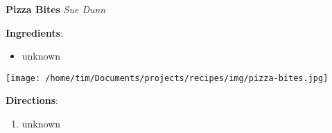 \documentclass[11pt, twoside, openany]{book}
\begin{document}
\noindent\begin{minipage}[t]{\linewidth}%
{\Large\textbf{Pizza Bites}} \label{pizza-bites}\hfill\textit{Sue Dunn}\\
\noindent\begin{minipage}[t]{0.78\linewidth}%
\textbf{Ingredients}:\vspace{-3mm}
\begin{multicols}{2}
\begin{itemize}\setlength\itemsep{-1mm}
\item unknown
\end{itemize}
\end{multicols}
\end{minipage}
\noindent\begin{minipage}[t]{0.18\linewidth}
\centering \strut\vspace*{-\baselineskip}\newline
\texttt{[image: /home/tim/Documents/projects/recipes/img/pizza-bites.jpg]}\\
\end{minipage}\vspace{3mm}
\textbf{Directions}:
\vspace{-3mm}\begin{enumerate}\setlength\itemsep{-1mm}
\item unknown
\end{enumerate}
\end{minipage}\vspace{8mm}
\end{document}
